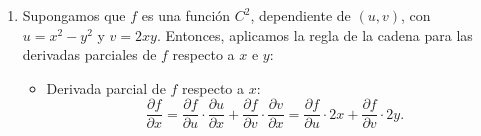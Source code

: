 \begin{enumerate}[label=\color{red}\textbf{\arabic*)}, leftmargin=*]
\item {}

	Supongamos que $f$ es una función $C^2$, dependiente de $(u,v)$, con $u=x^2-y^2$ y $v=2xy$. Entonces, aplicamos la regla de la cadena para las derivadas parciales de $f$ respecto a $x$ e $y$:
	\begin{itemize}
	\item Derivada parcial de $f$ respecto a $x$: \[ \dfrac{\partial f}{\partial x}=\dfrac{\partial f}{\partial u}\cdot\dfrac{\partial u}{\partial x}+\dfrac{\partial f}{\partial v}\cdot\dfrac{\partial v}{\partial x}=\dfrac{\partial f}{\partial u}\cdot 2x+\dfrac{\partial f}{\partial v}\cdot 2y. \]
	

\end{itemize}
\end{enumerate}
